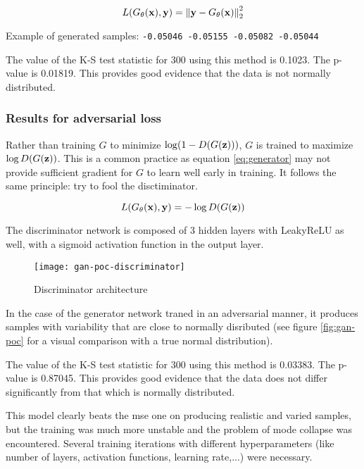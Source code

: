 \documentclass[../main.tex]{subfiles}
\begin{document}
\begin{equation}\label{eq:mse}
L(G_{\theta}(\mathbf{x}), \mathbf{y}) =
\left\| \mathbf{y} - G_{\theta}(\mathbf{x}) \right\|_2^2
\end{equation}

Example of generated samples:
\verb|-0.05046 -0.05155 -0.05082 -0.05044|

The value of the K-S test statistic for 300 using this method is 0.1023.
The p-value is 0.01819. This provides good evidence that the data is not
normally distributed.

\subsubsection{Results for adversarial loss}
Rather than training $G$ to minimize $\log (1 - D(G(\mathbf{z})))$,
$G$ is trained to maximize $\log D(G(\mathbf{z}))$.
This is a common practice as equation
\eqref{eq:generator} may not provide sufficient gradient for $G$ to learn well
early in training. It follows the same principle: try to fool the disctiminator.

\begin{equation}
L(G_{\theta}(\mathbf{x}), \mathbf{y}) = - \log D(G(\mathbf{z}))
\end{equation}

The discriminator network is composed of 3 hidden layers with LeakyReLU as well,
with a sigmoid activation function in the output layer.

\begin{figure}[h]
\centering
\texttt{[image: gan-poc-discriminator]}
\caption{Discriminator architecture}
\label{fig:fig:gan-poc-generator}
\end{figure}

In the case of the generator network traned in an adversarial manner,
it produces samples with variability that are close to normally disributed
(see figure \ref{fig:gan-poc} for a visual comparison with a true normal
distribution).

The value of the K-S test statistic for 300 using this method is 0.03383.
The p-value is 0.87045. This provides good evidence that the data does
not differ significantly from that which is normally distributed.

This model clearly beats the \gls{mse} one on producing realistic and varied
samples, but the training was much more unstable and the problem of mode
collapse was encountered. Several training iterations with different
hyperparameters (like number of layers, activation functions, learning rate,...)
were necessary.
\end{document}
